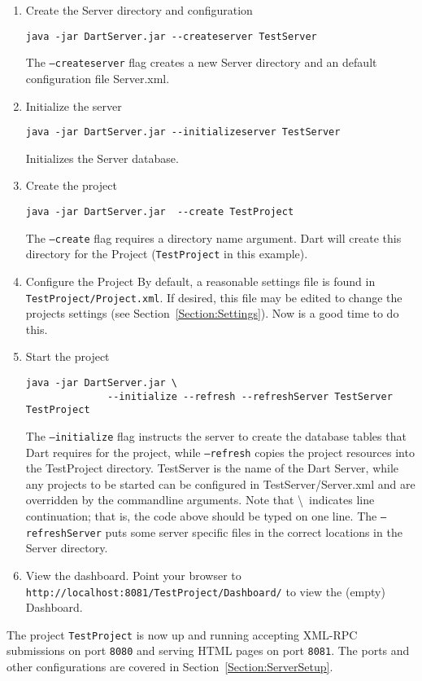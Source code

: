 \documentclass{InsightBook}
\begin{document}
\begin{enumerate}
    \item Create the Server directory and configuration\\
    \begin{verbatim}
java -jar DartServer.jar --createserver TestServer
    \end{verbatim}
    The \texttt{--createserver} flag creates a new Server directory and an default configuration file Server.xml.
    \item Initialize the server\\
    \begin{verbatim}
java -jar DartServer.jar --initializeserver TestServer
    \end{verbatim}
    Initializes the Server database.
    \item Create the project\\
    \begin{verbatim}
java -jar DartServer.jar  --create TestProject
    \end{verbatim}
    The \texttt{--create} flag requires a directory name argument.
    Dart will create this directory for the Project
    (\texttt{TestProject} in this example).

    \item Configure the Project
    By default, a reasonable settings file is found in
    \texttt{TestProject/Project.xml}.  If desired, this file may be
    edited to change the projects settings (see
    Section~\ref{Section:Settings}).  Now is a good time to do this.

    \item Start the project\\
    \begin{verbatim}
java -jar DartServer.jar \
              --initialize --refresh --refreshServer TestServer TestProject
    \end{verbatim}
    The \texttt{--initialize} flag instructs the server to create the
    database tables that Dart requires for the project, while \texttt{--refresh}
    copies the project resources into the TestProject directory.
    TestServer is the name of the Dart Server, while any projects to
    be started can be configured in TestServer/Server.xml and are
    overridden by the commandline arguments. Note that \textbackslash\
    indicates line continuation; that is, the code above should be
    typed on one line.  The \texttt{--refreshServer} puts some server
    specific files in the correct locations in the Server directory.
    \item View the dashboard.  Point your browser to
          \texttt{http://localhost:8081/TestProject/Dashboard/} to
          view the (empty) Dashboard.
\end{enumerate}
The project \texttt{TestProject} is now up and running accepting
XML-RPC submissions on port \texttt{8080} and serving HTML pages on
port \texttt{8081}.  The ports and other configurations are covered in
Section~\ref{Section:ServerSetup}.
\end{document}
